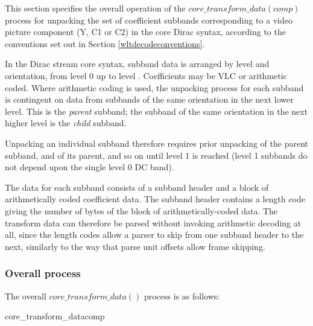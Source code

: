 
\label{transformdec}

This section specifies the overall operation of the $core\_transform\_data(comp)$ process
for unpacking the set of coefficient subbands corresponding
to a video picture component (Y, C1 or C2) in the core Dirac syntax, 
according to the conventions set out in Section \ref{wltdecodeconventions}.

In the Dirac stream core syntax, subband data is arranged by 
level and orientation, from level 0 up to level \TransformDepth. Coefficients may
be VLC or arithmetic coded. Where arithmetic coding is used, the unpacking process
 for each subband is contingent on data from subbands of the same orientation in 
 the next lower level. This is the {\em parent} subband; the subband of the same orientation in the next
higher level is the {\em child} subband. 

Unpacking an individual subband therefore requires prior unpacking of the parent subband,
and of its parent, and so on until level 1 is reached (level 1 subbands do not depend
upon the single level 0 DC band).

\begin{informative}
The data for each subband consists of a subband header and a block of arithmetically
coded coefficient data. The subband header contains a length code giving the number of
bytes of the block of arithmetically-coded data. The transform data can therefore be
parsed without invoking arithmetic decoding at all, since the length codes allow a 
parser to skip from one subband header to the next, similarly to the way that parse unit
offsets allow frame skipping.
\end{informative}


\subsubsection{Overall process}
The overall $core\_transform\_data()$ process is as follows:

\begin{pseudo}{core\_transform\_data}{comp}
  \bsEND
\bsEND
{}
\end{pseudo}

